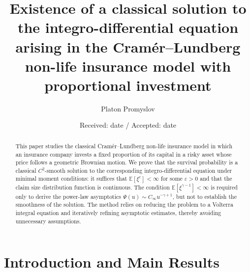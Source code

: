 \documentclass[smallextended]{svjour3}
\begin{document}
\title{Existence of a classical solution to the integro-differential equation arising in the Cram\'er--Lundberg non-life insurance model with proportional investment}


\author{Platon Promyslov}



\date{Received: date / Accepted: date}

\maketitle

\begin{abstract}
This paper studies the classical Cram\'er--Lundberg non-life insurance model in which an insurance company invests a fixed proportion of its capital in a risky asset whose price follows a geometric Brownian motion. We prove that the survival probability is a classical $C^2$-smooth solution to the corresponding integro-differential equation under minimal moment conditions: it suffices that $\mathbb{E}[\xi^\varepsilon]<\infty$ for some $\varepsilon>0$ and that the claim size distribution function is continuous. The condition $\mathbb{E}[\xi^{\gamma-1}]<\infty$ is required only to derive the power-law asymptotics $\Psi(u)\sim C_\infty u^{-\gamma+1}$, but not to establish the smoothness of the solution. The method relies on reducing the problem to a Volterra integral equation and iteratively refining asymptotic estimates, thereby avoiding unnecessary assumptions.

\end{abstract}

\section{Introduction and Main Results}
\end{document}
